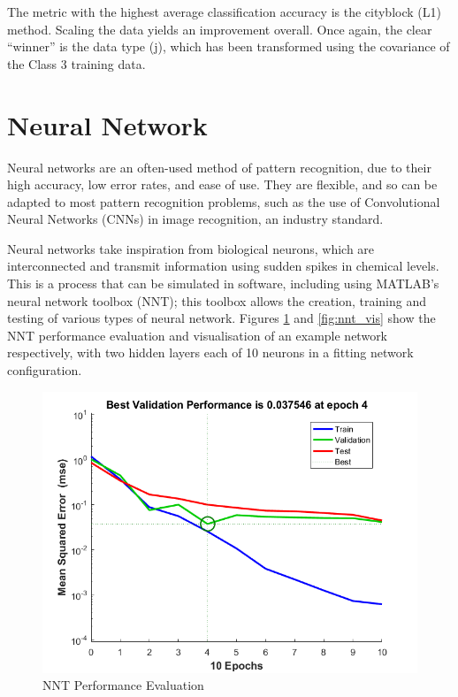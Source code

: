 \documentclass[a4paper, 10pt, conference]{ieeeconf}
\begin{document}
 The metric with the highest average classification accuracy is the cityblock (L1) method. Scaling the data yields an improvement overall. Once again, the clear ``winner'' is the data type (j), which has been transformed using the covariance of the Class 3 training data.

\section{Neural Network}


Neural networks are an often-used method of pattern recognition, due to their high accuracy, low error rates, and ease of use. They are flexible, and so can be adapted to most pattern recognition problems, such as the use of Convolutional Neural Networks (CNNs) in image recognition, an industry standard.

Neural networks take inspiration from biological neurons, which are interconnected and transmit information using sudden spikes in chemical levels. This is a process that can be simulated in software, including using MATLAB's neural network toolbox (NNT); this toolbox allows the creation, training and testing of various types of neural network. Figures \ref{fig:nnt_perf} and \ref{fig:nnt_vis} show the NNT performance evaluation and visualisation of an example network respectively, with two hidden layers each of 10 neurons in a fitting network configuration.

\begin{figure}[!ht]
    \centering
    \includegraphics[width=\linewidth]{pic/performance}
    \caption{NNT Performance Evaluation}
    \label{fig:nnt_perf}
\end{figure}
\end{document}
